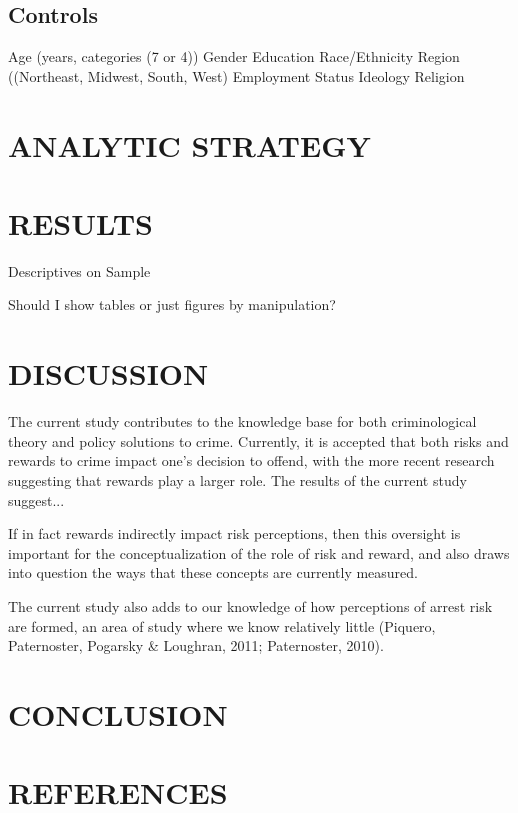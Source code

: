 \documentclass{article} %
\begin{document}
\begin{enumerate}[A]
{\subsection{Controls}

Age (years, categories (7 or 4))
Gender
Education
Race/Ethnicity 
Region ((Northeast, Midwest, South, West)
Employment Status
Ideology
Religion




\section{ANALYTIC STRATEGY}

\section{RESULTS}


Descriptives on Sample

Should I show tables or just figures by manipulation?




\section{DISCUSSION}

The current study contributes to the knowledge base for both criminological theory and policy solutions to crime. Currently, it is accepted that both risks and rewards to crime impact one’s decision to offend, with the more recent research suggesting that rewards play a larger role. The results of the current study suggest...

 If in fact rewards indirectly impact risk perceptions, then this oversight is important for the conceptualization of the role of risk and reward, and also draws into question the ways that these concepts are currently measured.

The current study also adds to our knowledge of how perceptions of arrest risk are formed, an area of study where we know relatively little (Piquero, Paternoster, Pogarsky & Loughran, 2011; Paternoster, 2010). 



\section{CONCLUSION}

\section{REFERENCES}


}
\end{enumerate}
\end{document}
